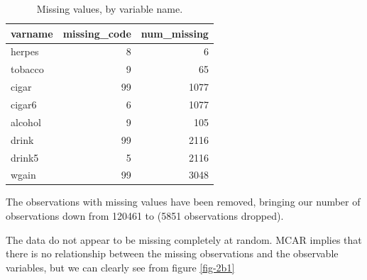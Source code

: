 \documentclass[12pt]{article}
\begin{document}
\begin{table}[ht]
\centering
\caption{Missing values, by variable name.} 
\begin{tabular}{lrr}
  \hline
varname & missing\_code & num\_missing \\ 
  \hline
herpes &   8 &   6 \\ 
  tobacco &   9 &  65 \\ 
  cigar &  99 & 1077 \\ 
  cigar6 &   6 & 1077 \\ 
  alcohol &   9 & 105 \\ 
  drink &  99 & 2116 \\ 
  drink5 &   5 & 2116 \\ 
  wgain &  99 & 3048 \\ 
   \hline
\end{tabular}
\end{table}

The observations with missing values have been removed, bringing our number of observations down from 120461 to  (5851 observations dropped).

\vem
{}

The data do not appear to be missing completely at random. MCAR implies that there is no relationship between the missing observations and the observable variables, but we can clearly see from figure \ref{fig-2b1}
\end{document}

